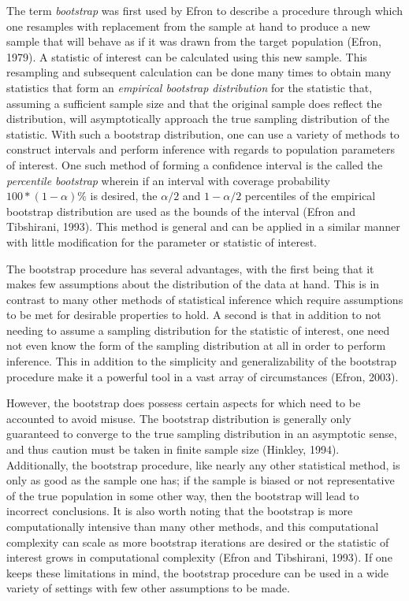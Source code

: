 		The term \textit{bootstrap} was first used by Efron to describe a procedure through which one resamples with replacement from the sample at hand to produce a new sample that will behave as if it
		was drawn from the target population (Efron, 1979). A statistic of interest can be calculated using this new sample. This resampling and subsequent calculation can be done many times to obtain many statistics that form an
		\textit{empirical bootstrap distribution} for the statistic that, assuming a sufficient sample size and that the original sample does reflect the distribution, will asymptotically approach the
		true sampling distribution of the statistic. With such a bootstrap distribution, one can use a variety of methods to construct intervals and perform inference with regards to population
		parameters of interest. One such method of forming a confidence interval is the called the \textit{percentile bootstrap} wherein if an interval with coverage probability $100*(1-\alpha) \%$ is
		desired, the $\alpha/2$ and $1-\alpha/2$ percentiles of the empirical bootstrap distribution are used as the bounds of the interval (Efron and Tibshirani, 1993). This method is general and
		can be applied in a similar manner with little modification for the parameter or statistic of interest.

		The bootstrap procedure has several advantages, with the first being that it makes few assumptions about the distribution of the data at hand. This is in contrast to many other methods of
		statistical inference which require assumptions to be met for desirable properties to hold. A second is that in addition to not needing to assume a sampling distribution for the statistic
		of interest, one need not even know the form of the sampling distribution at all in order to perform inference. This in addition to the simplicity and generalizability of the bootstrap procedure
		make it a powerful tool in a vast array of circumstances  (Efron, 2003).

		However, the bootstrap does possess certain aspects for which need to be accounted to avoid misuse. The bootstrap distribution is generally only guaranteed to converge to the true sampling
		distribution in an asymptotic sense, and thus caution must be taken in finite sample size (Hinkley, 1994). Additionally, the bootstrap procedure, like nearly any other statistical method,
		is only as good as the sample one has; if the sample is biased or not representative of the true population in some other way, then the bootstrap will lead to incorrect conclusions. It is also
		worth noting that the bootstrap is more computationally intensive than many other methods, and this computational complexity can scale as more bootstrap iterations are desired or the statistic
		of interest grows in computational complexity (Efron and Tibshirani, 1993). If one keeps these limitations in mind, the bootstrap procedure can be used in a wide variety of settings with few
		other assumptions to be made.

